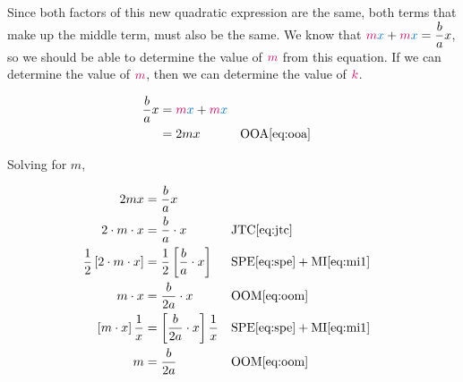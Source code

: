 \documentclass[20150903-160354-rs2.2-MarksMathNotebook.tex]{subfiles}
\begin{document}
Since both factors of this new quadratic expression are the same, both terms that make up the middle term,  must also be the same.  We know that ${\color{sthlmRed}m}{\color{sthlmBlue}x} + {\color{sthlmRed}m}{\color{sthlmBlue}x}=\dfrac{b}{a}x$, so we should be able to determine the value of ${\color{sthlmRed}m}$ from this equation.    If we can determine the value of ${\color{sthlmRed}m}$, then we can determine the value of  ${\color{sthlmRed}k}$.

\begin{align*}
\dfrac{b}{a}x 	& = \textcolor{sthlmRed}{m}\textcolor{sthlmBlue}{x} + \textcolor{sthlmRed}{m}\textcolor{sthlmBlue}{x}\\
		& = 2mx && \text{OOA} \eqref{eq:ooa} \\
\end{align*}

Solving for $m$,

\begin{align*}
2mx & = \dfrac{b}{a}x \\
2 \cdot m \cdot x &= \dfrac{b}{a} \cdot x  && \text{JTC} \eqref{eq:jtc} \\
\dfrac{1}{2} \left[2 \cdot m \cdot x \right] &= \dfrac{1}{2} \left[\dfrac{b}{a} \cdot x \right]  && \text{SPE} \eqref{eq:spe} + \text{MI} \eqref{eq:mi1} \\
m \cdot  x &= \dfrac{b}{2a} \cdot x  && \text{OOM} \eqref{eq:oom} \\
\left[m \cdot x \right]\dfrac{1}{x}  &= \left[\dfrac{b}{2a}  \cdot x\right] \dfrac{1}{x}  && \text{SPE} \eqref{eq:spe} + \text{MI} \eqref{eq:mi1} \\
m &= \dfrac{b}{2a}  && \text{OOM} \eqref{eq:oom}
\end{align*}


\end{document}

